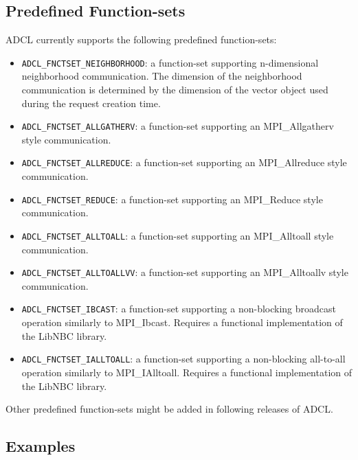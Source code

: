 \pagebreak
\subsection{Predefined Function-sets}
\label{fnctset-predef}

ADCL currently supports the following  predefined function-sets: 
\begin{itemize}
\item {\tt ADCL\_FNCTSET\_NEIGHBORHOOD}: a function-set supporting
  n-dimensional neighborhood communication. The dimension of the neighborhood
  communication is determined by the dimension of the vector object used
  during the request creation time.
\item {\tt ADCL\_FNCTSET\_ALLGATHERV}: a function-set supporting an
  MPI\_Allgatherv style communication.
\item {\tt ADCL\_FNCTSET\_ALLREDUCE}: a function-set supporting an
  MPI\_Allreduce style communication.
\item {\tt ADCL\_FNCTSET\_REDUCE}: a function-set supporting an
  MPI\_Reduce style communication.
\item {\tt ADCL\_FNCTSET\_ALLTOALL}: a function-set supporting an
  MPI\_Alltoall style communication.
\item {\tt ADCL\_FNCTSET\_ALLTOALLVV}: a function-set supporting an
  MPI\_Alltoallv style communication.
\item {\tt ADCL\_FNCTSET\_IBCAST}: a function-set supporting a non-blocking
  broadcast operation similarly to MPI\_Ibcast. Requires a functional
  implementation of the LibNBC library.
\item {\tt ADCL\_FNCTSET\_IALLTOALL}: a function-set supporting a non-blocking
  all-to-all operation similarly to MPI\_IAlltoall. Requires a functional
  implementation of the LibNBC library.
 
\end{itemize}

Other predefined function-sets might be added in following releases of ADCL.

\subsection{Examples}


